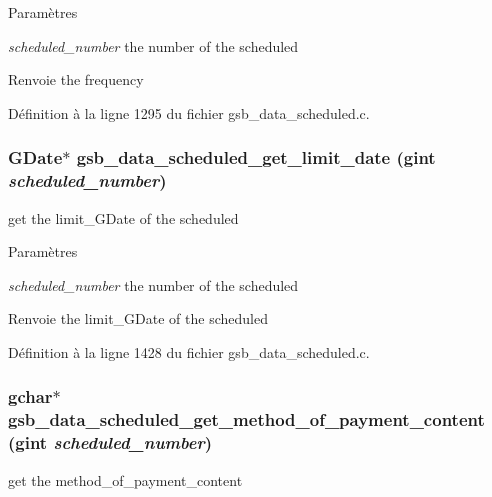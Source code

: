 \begin{DoxyParams}{Paramètres}
\item[{\em scheduled\_\-number}]the number of the scheduled\end{DoxyParams}
\begin{DoxyReturn}{Renvoie}
the frequency 
\end{DoxyReturn}


Définition à la ligne 1295 du fichier gsb\_\-data\_\-scheduled.c.

\subsubsection[{gsb\_\-data\_\-scheduled\_\-get\_\-limit\_\-date}]{\setlength{\rightskip}{0pt plus 5cm}GDate$\ast$ gsb\_\-data\_\-scheduled\_\-get\_\-limit\_\-date (gint {\em scheduled\_\-number})}\label{gsb__data__scheduled_8c_a7817b56aaa3000e66de01e0d436f267f}
get the limit\_\-GDate of the scheduled


\begin{DoxyParams}{Paramètres}
\item[{\em scheduled\_\-number}]the number of the scheduled\end{DoxyParams}
\begin{DoxyReturn}{Renvoie}
the limit\_\-GDate of the scheduled 
\end{DoxyReturn}


Définition à la ligne 1428 du fichier gsb\_\-data\_\-scheduled.c.

\subsubsection[{gsb\_\-data\_\-scheduled\_\-get\_\-method\_\-of\_\-payment\_\-content}]{\setlength{\rightskip}{0pt plus 5cm}gchar$\ast$ gsb\_\-data\_\-scheduled\_\-get\_\-method\_\-of\_\-payment\_\-content (gint {\em scheduled\_\-number})}\label{gsb__data__scheduled_8c_a906e28f3b1d76861e4cd297bb59d66d5}
get the method\_\-of\_\-payment\_\-content


